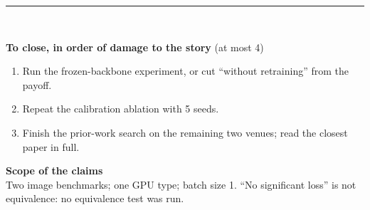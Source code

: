 \documentclass[10pt]{article}
\begin{document}
\rule{\linewidth}{0.4pt}\\[3pt]
\begin{minipage}[t]{0.60\linewidth}\small
\textbf{To close, in order of damage to the story} (at most 4)
\begin{enumerate}[label=\textbf{\arabic*.}]
\item Run the frozen-backbone experiment, or cut ``without retraining'' from the payoff.
\item Repeat the calibration ablation with 5 seeds.
\item Finish the prior-work search on the remaining two venues; read the closest paper in full.
\end{enumerate}
\end{minipage}\hfill
\begin{minipage}[t]{0.36\linewidth}\small
\textbf{Scope of the claims}\\
Two image benchmarks; one GPU type; batch size 1. ``No significant loss'' is not equivalence: no equivalence test was run.
\end{minipage}
\end{document}
